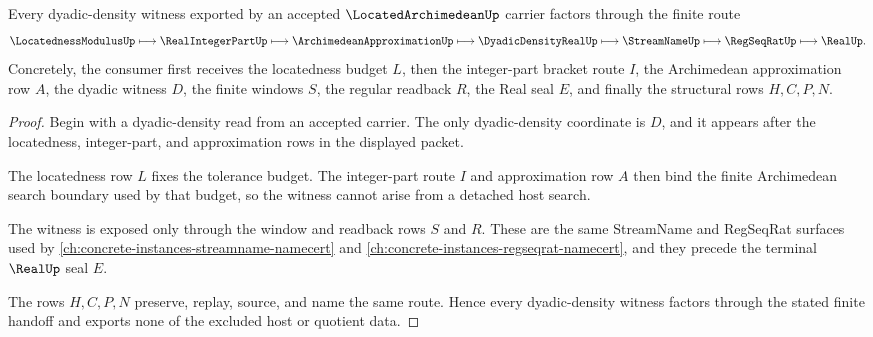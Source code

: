 \begin{theorem}
\label{thm:located-archimedean-dyadic-density-handoff}
Every dyadic-density witness exported by an accepted $\LocatedArchimedeanUp$ carrier factors through the finite route
$$
\LocatednessModulusUp \longmapsto \RealIntegerPartUp \longmapsto \ArchimedeanApproximationUp \longmapsto \DyadicDensityRealUp \longmapsto \StreamNameUp \longmapsto \RegSeqRatUp \longmapsto \RealUp .
$$
Concretely, the consumer first receives the locatedness budget $L$, then the integer-part bracket route $I$, the Archimedean approximation row $A$, the dyadic witness $D$, the finite windows $S$, the regular readback $R$, the Real seal $E$, and finally the structural rows $H,C,P,N$.
\end{theorem}
\begin{proof}
Begin with a dyadic-density read from an accepted carrier. The only dyadic-density coordinate is $D$, and it appears after the locatedness, integer-part, and approximation rows in the displayed packet.

The locatedness row $L$ fixes the tolerance budget. The integer-part route $I$ and approximation row $A$ then bind the finite Archimedean search boundary used by that budget, so the witness cannot arise from a detached host search.

The witness is exposed only through the window and readback rows $S$ and $R$. These are the same StreamName and RegSeqRat surfaces used by \autoref{ch:concrete-instances-streamname-namecert} and \autoref{ch:concrete-instances-regseqrat-namecert}, and they precede the terminal $\RealUp$ seal $E$.

The rows $H,C,P,N$ preserve, replay, source, and name the same route. Hence every dyadic-density witness factors through the stated finite handoff and exports none of the excluded host or quotient data.
\end{proof}

